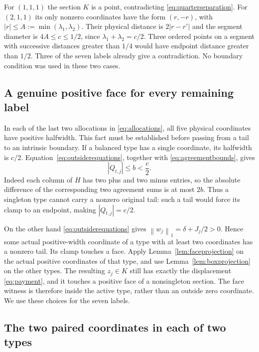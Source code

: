 \documentclass[11pt]{article}
\theoremstyle{definition}
\theoremstyle{remark}
\newcommand{\norm}[1]{\left\lVert#1\right\rVert_1}
\newcommand{\abs}[1]{\left|#1\right|}
\begin{document}
For $(1,1,1)$ the section $K$ is a point, contradicting
\eqref{eq:quarterseparation}. For $(2,1,1)$ its only nonzero
coordinates have the form $(r,-r)$, with
$\abs r\leq A:=\min(\lambda_1,\lambda_2)$. Their physical distance
is $2\abs{r-r'}$ and the segment diameter is $4A\leq c\leq1/2$,
since $\lambda_1+\lambda_2=c/2$. Three ordered points on a segment
with successive distances greater than $1/4$ would have endpoint
distance greater than $1/2$. Three of the seven labels already give
a contradiction. No boundary condition was used in these two cases.

\subsection{A genuine positive face for every remaining label}

In each of the last two allocations in \eqref{eq:allocations}, all
five physical coordinates have positive halfwidth. This fact must be
established before passing from a tail to an intrinsic boundary.
If a balanced type has a single coordinate, its halfwidth is $c/2$.
Equation~\eqref{eq:outsiderequations}, together with
\eqref{eq:agreementbounds}, gives
\[
 \abs{Q_{t,j}}\leq b<\frac c2.
\]
Indeed each column of $H$ has two plus and two minus entries, so the
absolute difference of the corresponding two agreement sums is at
most $2b$. Thus a singleton type cannot carry a nonzero original tail:
such a tail would force its clamp to an endpoint, making
$\abs{Q_{t,j}}=c/2$.

On the other hand \eqref{eq:outsiderequations} gives
$\norm{w_j}=\delta+J_j/2>0$. Hence some actual positive-width
coordinate of a type with at least two coordinates has a nonzero tail.
Its clamp touches a face. Apply Lemma~\ref{lem:faceprojection} on
the actual positive coordinates of that type, and use
Lemma~\ref{lem:boxprojection} on the other types. The resulting
$z_j\in K$ still has exactly the displacement \eqref{eq:payment},
and it touches a positive face of a nonsingleton section.
The face witness is therefore inside the active type, rather than an
outside zero coordinate. We use these choices for the seven labels.

\subsection{The two paired coordinates in each of two types}
\end{document}

